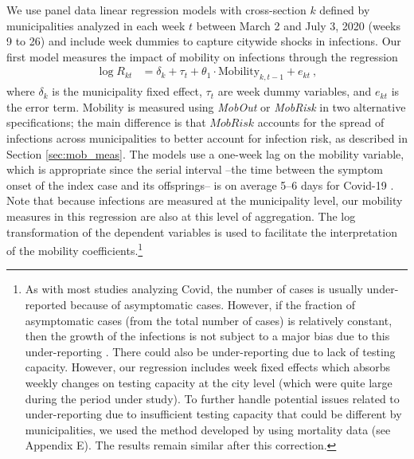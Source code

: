 We use panel data linear regression models with cross-section $k$ defined by municipalities analyzed in each week $t$ between March 2 and July 3, 2020 (weeks 9 to 26) and include week dummies to capture citywide shocks in infections. Our first model measures the impact of mobility on infections through the regression
\begin{align} %
\log R_{kt} &= \delta_k + \tau_t +\theta_1\cdot \mbox{Mobility}_{k,t-1} + e_{kt} \ , \label{eq:inf_mob}
\end{align}
where $\delta_{k}$ is the municipality fixed effect,  $\tau_{t}$ are week dummy variables, and $e_{kt}$ is the error term. Mobility is measured using  \textit{MobOut} or \textit{MobRisk} in two alternative specifications; the main difference is that $MobRisk$ accounts for the spread of infections across municipalities to better account for infection risk, as described in Section \ref{sec:mob_meas}. The models use a one-week lag on the mobility variable, which is appropriate since the serial interval --the time between the symptom onset of the index case and its offsprings-- is on average 5--6 days for Covid-19 \citep{lauer2020incubation,rai2020estimates}. Note that because infections are measured at the municipality level, our mobility measures in this regression are also at this level of aggregation. The log transformation of the dependent variables is used to facilitate the interpretation of the mobility coefficients.\footnote{As with most studies analyzing Covid, the number of cases is usually under-reported because of asymptomatic cases. However, if the fraction of asymptomatic cases (from the total number of cases) is relatively constant, then the growth of the infections  is not subject to a major bias due to this under-reporting \citep{bandt2020reproduction}. There could also be under-reporting due to lack of testing capacity. However, our regression includes week fixed effects which absorbs weekly changes on testing capacity at the city level (which were quite large during the period under study). To further handle potential issues related to under-reporting due to insufficient testing capacity that could be different by municipalities, we used the method developed by \cite{russell2020reconstructing} using mortality data (see Appendix E). The results remain similar after this correction.}
 
